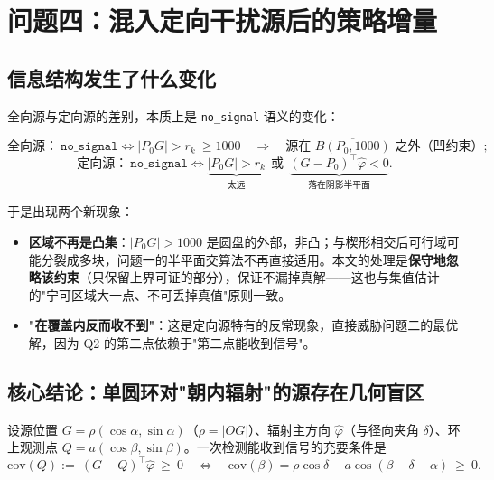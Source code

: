 \section{问题四：混入定向干扰源后的策略增量}
\label{sec:q4}

\subsection{信息结构发生了什么变化}

全向源与定向源的差别，本质上是 \texttt{no\_signal} 语义的变化：

\begin{equation}
\text{全向源：}\ \texttt{no\_signal}\iff |P_0G|>r_k\ \ge 1000
\quad\Longrightarrow\quad
\text{源在 }\overline{B(P_0,1000)}\text{ 之外（凹约束）};
\end{equation}
\begin{equation}
\text{定向源：}\ \texttt{no\_signal}\iff \underbrace{|P_0G|>r_k}_{\text{太远}}\ \ \text{或}\ \ \underbrace{(G-P_0)^{\!\top}\hat\varphi<0}_{\text{落在阴影半平面}}.
\end{equation}

于是出现两个新现象：

\begin{itemize}
  \item \textbf{区域不再是凸集}：$|P_0G|>1000$ 是圆盘的外部，非凸；与楔形相交后可行域可能分裂成多块，问题一的半平面交算法不再直接适用。本文的处理是\textbf{保守地忽略该约束}（只保留上界可证的部分），保证不漏掉真解——这也与集值估计的"宁可区域大一点、不可丢掉真值"原则一致。
  \item \textbf{"在覆盖内反而收不到"}：这是定向源特有的反常现象，直接威胁问题二的最优解，因为 Q2 的第二点依赖于"第二点能收到信号"。
\end{itemize}

\subsection{核心结论：单圆环对"朝内辐射"的源存在几何盲区}

设源位置 $G=\rho(\cos\alpha,\sin\alpha)$（$\rho=|OG|$）、辐射主方向 $\hat\varphi$（与径向夹角 $\delta$）、环上观测点 $Q=a(\cos\beta,\sin\beta)$。一次检测能收到信号的充要条件是
\begin{equation}
\mathrm{cov}(Q):=\ (G-Q)^{\!\top}\hat\varphi\ \ge\ 0
\quad\Longleftrightarrow\quad
\mathrm{cov}(\beta)=\rho\cos\delta-a\cos(\beta-\delta-\alpha)\ \ge\ 0 .
\label{eq:cov}
\end{equation}

